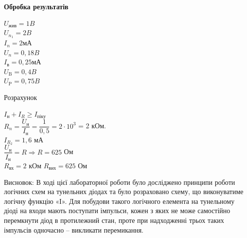 \documentclass[a4paper,14pt]{extreport}
\begin{document}
 

\begin{center}
\textbf{Обробка результатів}
\end{center}
\begin{minipage}{0.35\textwidth}
\begin{tcolorbox}[ title=\textbf{Дано (варіант 13)}]
$U_{\text{жив}}= 1 B$\\
$U_{n_1}= 2 B$\\
$I_n = 2 \text{мА}$\\
$U_{n}= 0,18 B$\\
$I_{\text{в}} = 0,25 \text{мА}$\\
$U_{\text{B}}= 0,4 B$\\
$U_{\text{P}}= 0,75 B$\\
\end{tcolorbox}
\end{minipage}
\hfill
\begin{minipage}{0.6\textwidth}
\begin{center}Розрахунок\end{center}
$I_{\text{н}} + I_{R} \ge I_{\text{піку}}$\\

$R_{n} = \dfrac{U_{\text{н}}}{I_{\text{н}}} = \dfrac{1}{0,5} = 2\cdot 10^{3}$ = 2 кОм.\\

$I_{R_2} = 1,6 $ мА\\

$\dfrac{U_{\text{н}}}{I_{\text{н}}} = R \Rightarrow R = 625 $ Ом\\ 

$R_{\text{вх}} = 2 $ кОм
$R_{\text{вих}} = 625 $  Ом



\end{minipage}

\vspace*{1cm}
Висновок: В ході цієї лабораторної роботи було досліджено принципи роботи  
логічних схем на тунельних діодах та було розраховано схему, що виконуватиме  
логічну функцію «І». Для побудови такого логічного елемента на тунельному  
діоді на входи мають поступати імпульси, кожен з яких не може самостійно  
перемкнути діод в протилежний стан, проте при надходженні трьох таких  
імпульсів одночасно – викликати перемикання.
\end{document}
